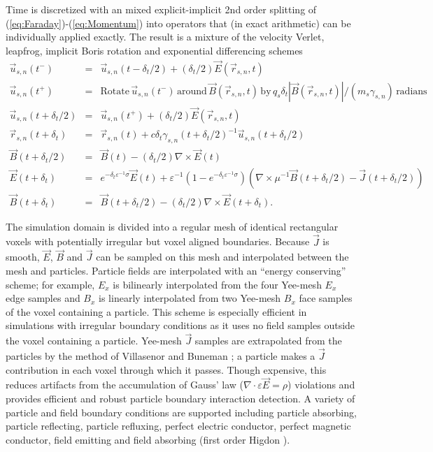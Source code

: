 \documentclass[letter,10pt]{article}
\newcommand{\eps}{\varepsilon}
\newcommand{\vecr}{\vec{r}}
\newcommand{\vecu}{\vec{u}}
\newcommand{\vecJ}{\vec{J}}
\newcommand{\vecE}{\vec{E}}
\newcommand{\vecB}{\vec{B}}
\newcommand{\Div}[1]{\nabla \cdot #1}
\newcommand{\Curl}[1]{\nabla \times #1}
\newcommand{\eq}[1]{(\ref{eq:#1})}
\begin{document}
Time is discretized with an mixed explicit-implicit 2nd order splitting of
\eq{Faraday}-\eq{Momentum} into operators that (in exact arithmetic)
can be individually applied exactly.  The result is a mixture of the
velocity Verlet, leapfrog, implicit Boris rotation and exponential differencing
schemes
\begin{eqnarray}
\vecu_{s,n}\left(t^-\right) &=&\vecu_{s,n}\left(t-\delta_t/2\right) +
  \left(\delta_t/2\right)\vecE\left(\vecr_{s,n},t\right) \\
\vecu_{s,n}\left(t^+\right) &=&
  \textrm{Rotate}\,\vecu_{s,n}\left(t^-\right)\,\textrm{around}\,
  \vecB\left(\vecr_{s,n},t\right)\,\textrm{by}\,
  q_s\delta_t\left|\vecB\left(\vecr_{s,n},t\right)\right| /
  \left(m_s\gamma_{s,n}\right)\,\textrm{radians} \\
\vecu_{s,n}\left(t+\delta_t/2\right) &=&\vecu_{s,n}\left(t^+\right) +
  \left(\delta_t/2\right)\vecE\left(\vecr_{s,n},t\right) \\
\vecr_{s,n}\left(t+\delta_t\right) &=& \vecr_{s,n}\left(t\right) +
  c\delta_t\gamma_{s,n}\left(t+\delta_t/2\right)^{-1}
           \vecu_{s,n}\left(t+\delta_t/2\right) \\
\vecB\left(t+\delta_t/2\right) &=&
  \vecB\left(t\right) -
  \left(\delta_t/2\right)\Curl{\vecE\left(t\right)} \\
\vecE\left(t+\delta_t\right) &=&
  e^{-\delta_t\eps^{-1}\sigma}\vecE\left(t\right) +
  \eps^{-1}\left(1-e^{-\delta_t\eps^{-1}\sigma}\right)
    \left( \Curl{\mu^{-1}\vecB\left(t+\delta_t/2\right)} -
           \vecJ\left(t+\delta_t/2\right) \right) \\
\vecB\left(t+\delta_t\right) &=& \vecB\left(t+\delta_t/2\right) -
  \left(\delta_t/2\right)\Curl{\vecE\left(t+\delta_t\right)}
.
\end{eqnarray}

The simulation domain is divided into a regular mesh of identical
rectangular voxels with potentially irregular but voxel aligned
boundaries.  Because $\vecJ$ is smooth, $\vecE$, $\vecB$ and $\vecJ$
can be sampled on this mesh and interpolated between the mesh and
particles.  Particle fields are interpolated with an ``energy
conserving'' scheme; for example, $E_x$ is bilinearly interpolated
from the four Yee-mesh $E_x$ edge samples and $B_x$ is linearly
interpolated from two Yee-mesh $B_x$ face samples of the voxel containing a
particle.  This scheme is especially efficient in simulations with
irregular boundary conditions as it uses no field samples outside the
voxel containing a particle.  Yee-mesh $\vecJ$ samples are
extrapolated from the particles by the method of Villasenor and
Buneman \cite{Villasenor_Buneman_1992}; a particle makes a $\vecJ$
contribution in each voxel through which it passes.  Though expensive,
this reduces artifacts from the accumulation of Gauss' law
($\Div{\eps\vecE}=\rho$) violations and provides efficient and robust
particle boundary interaction detection.  A variety of particle and
field boundary conditions are supported including particle absorbing,
particle reflecting, particle refluxing, perfect electric conductor,
perfect magnetic conductor, field emitting and field absorbing (first
order Higdon \cite{Higdon_1986}).
\end{document}
